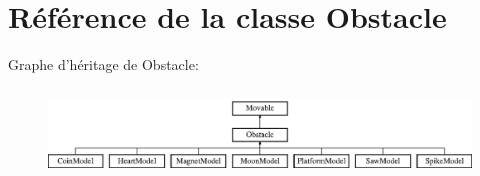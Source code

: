 \hypertarget{class_obstacle}{\section{Référence de la classe Obstacle}
\label{class_obstacle}
}
Graphe d'héritage de Obstacle\+:\begin{figure}[H]
\begin{center}
\leavevmode
\includegraphics[height=2.376238cm]{class_obstacle}
\end{center}
\end{figure}
